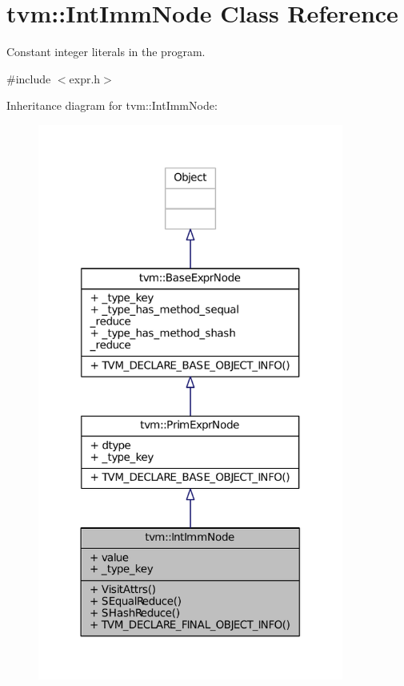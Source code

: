 \hypertarget{classtvm_1_1IntImmNode}{}\section{tvm\+:\+:Int\+Imm\+Node Class Reference}
\label{classtvm_1_1IntImmNode}


Constant integer literals in the program.  




{\ttfamily \#include $<$expr.\+h$>$}



Inheritance diagram for tvm\+:\+:Int\+Imm\+Node\+:
\nopagebreak
\begin{figure}[H]
\begin{center}
\leavevmode
\includegraphics[width=285pt]{classtvm_1_1IntImmNode__inherit__graph}
\end{center}
\end{figure}


